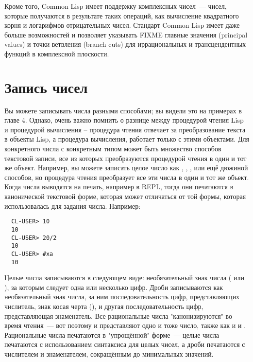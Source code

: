 Кроме того, Common Lisp имеет поддержку комплексных чисел~--- чисел, которые получаются в
результате таких операций, как вычисление квадратного корня и логарифмов отрицательных
чисел. Стандарт Common Lisp имеет даже больше возможностей и позволяет указывать FIXME
главные значения (principal values) и точки ветвления (branch cuts) для иррациональных и
трансцендентных функций в комплексной плоскости.

\section{Запись чисел}

Вы можете записывать числа разными способами; вы видели это на примерах в главе 4.
Однако, очень важно помнить о разнице между процедурой чтения Lisp и процедурой вычисления
-- процедура чтения отвечает за преобразование текста в объекты Lisp, а процедура
вычисления, работает только с этими объектами.  Для конкретного числа с конкретным типом
может быть множество способов текстовой записи, все из которых преобразуются процедурой
чтения в один и тот же объект.  Например, вы можете записать целое число  как
, , , или ещё дюжиной способов, но процедура чтения
преобразует все эти числа в один и тот же объект.  Когда числа выводятся на печать,
например в REPL, тогда они печатаются в канонической текстовой форме, которая может
отличаться от той формы, которая использовалась для задания числа.  Например:

\begin{verbatim}
  CL-USER> 10
  10
  CL-USER> 20/2
  10
  CL-USER> #xa
  10
\end{verbatim}

Целые числа записываются в следующем виде: необязательный знак числа (\code{+} или
\code{-}), за которым следует одна или несколько цифр.  Дроби записываются как
необязательный знак числа, за ним последовательность цифр, представляющих числитель, знак
косая черта (\code{/}), и другая последовательность цифр, представляющая знаменатель.  Все
рациональные числа "канонизируются" во время чтения~--- вот поэтому  и 
представляют одно и тоже число, также как и  и .  Рациональные числа
печатаются в "упрощённой" форме~--- целые числа печатаются с использованием синтаксиса для
целых чисел, а дроби печатаются с числителем и знаменателем, сокращённым до минимальных
значений.


